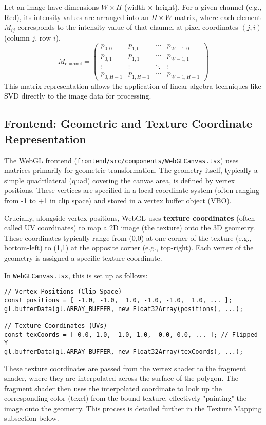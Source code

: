 \documentclass{article}
\begin{document}
Let an image have dimensions $W \times H$ (width $\times$ height). For a given channel (e.g., Red), its intensity values are arranged into an $H \times W$ matrix, where each element $M_{ij}$ corresponds to the intensity value of that channel at pixel coordinates $(j, i)$ (column $j$, row $i$).
\[
M_{\text{channel}} =
\begin{pmatrix}
p_{0,0} & p_{1,0} & \cdots & p_{W-1,0} \\
p_{0,1} & p_{1,1} & \cdots & p_{W-1,1} \\
\vdots & \vdots & \ddots & \vdots \\
p_{0,H-1} & p_{1,H-1} & \cdots & p_{W-1,H-1}
\end{pmatrix}
\]
This matrix representation allows the application of linear algebra techniques like SVD directly to the image data for processing.

\subsection{Frontend: Geometric and Texture Coordinate Representation}
The WebGL frontend (\texttt{frontend/src/components/WebGLCanvas.tsx}) uses matrices primarily for geometric transformation. The geometry itself, typically a simple quadrilateral (quad) covering the canvas area, is defined by vertex positions. These vertices are specified in a local coordinate system (often ranging from -1 to +1 in clip space) and stored in a vertex buffer object (VBO).

Crucially, alongside vertex positions, WebGL uses \textbf{texture coordinates} (often called UV coordinates) to map a 2D image (the texture) onto the 3D geometry. These coordinates typically range from (0,0) at one corner of the texture (e.g., bottom-left) to (1,1) at the opposite corner (e.g., top-right). Each vertex of the geometry is assigned a specific texture coordinate.

In \texttt{WebGLCanvas.tsx}, this is set up as follows:
\begin{verbatim}
// Vertex Positions (Clip Space)
const positions = [ -1.0, -1.0,  1.0, -1.0, -1.0,  1.0, ... ];
gl.bufferData(gl.ARRAY_BUFFER, new Float32Array(positions), ...);

// Texture Coordinates (UVs)
const texCoords = [ 0.0, 1.0,  1.0, 1.0,  0.0, 0.0, ... ]; // Flipped Y
gl.bufferData(gl.ARRAY_BUFFER, new Float32Array(texCoords), ...);
\end{verbatim}
These texture coordinates are passed from the vertex shader to the fragment shader, where they are interpolated across the surface of the polygon. The fragment shader then uses the interpolated coordinate to look up the corresponding color (texel) from the bound texture, effectively "painting" the image onto the geometry. This process is detailed further in the Texture Mapping subsection below.
\end{document}
